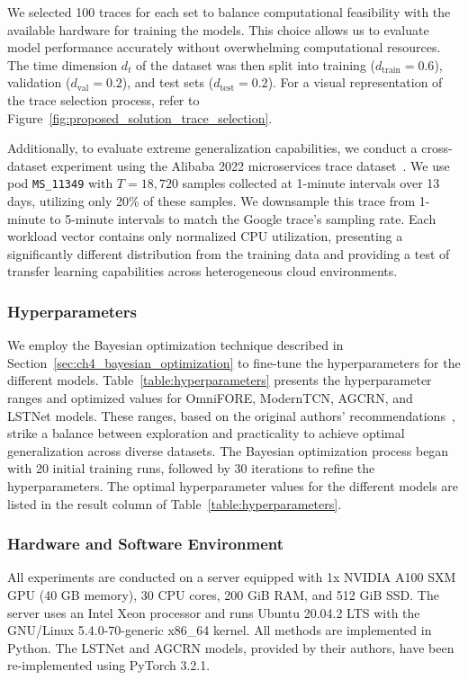 We selected 100 traces for each set to balance computational feasibility with the available hardware for training the models. This choice allows us to evaluate model performance accurately without overwhelming computational resources. The time dimension $d_t$ of the dataset was then split into training ($d_\text{train} = 0.6$), validation ($d_\text{val} = 0.2$), and test sets ($d_\text{test} = 0.2$). For a visual representation of the trace selection process, refer to Figure~\ref{fig:proposed_solution_trace_selection}.

Additionally, to evaluate extreme generalization capabilities, we conduct a cross-dataset experiment using the Alibaba 2022 microservices trace dataset~\cite{8258257}. We use pod \texttt{MS\_11349} with $T = 18,\!720$ samples collected at 1-minute intervals over 13 days, utilizing only 20\% of these samples. We downsample this trace from 1-minute to 5-minute intervals to match the Google trace's sampling rate. Each workload vector contains only normalized \ac{CPU} utilization, presenting a significantly different distribution from the training data and providing a test of transfer learning capabilities across heterogeneous cloud environments.

\subsubsection{\textbf{Hyperparameters}}
We employ the Bayesian optimization technique described in Section~\ref{sec:ch4_bayesian_optimization} to fine-tune the hyperparameters for the different models. Table~\ref{table:hyperparameters} presents the hyperparameter ranges and optimized values for \ac{OmniFORE}, \ac{ModernTCN}, AGCRN, and \ac{LSTNet} models. These ranges, based on the original authors' recommendations~\cite{AGCRN, lai2018modelinglongshorttermtemporal, ModernTCN}, strike a balance between exploration and practicality to achieve optimal generalization across diverse datasets. The Bayesian optimization process began with 20 initial training runs, followed by 30 iterations to refine the hyperparameters. The optimal hyperparameter values for the different models are listed in the result column of Table~\ref{table:hyperparameters}.

\subsubsection{\textbf{Hardware and Software Environment}}
All experiments are conducted on a server equipped with 1x NVIDIA A100 SXM \ac{GPU} (40 \ac{GB} memory), 30 \ac{CPU} cores, 200 \ac{GiB} \ac{RAM}, and 512 \ac{GiB} \ac{SSD}. The server uses an Intel Xeon processor and runs Ubuntu 20.04.2 LTS with the GNU/Linux 5.4.0-70-generic x86\_64 kernel. All methods are implemented in Python. The \ac{LSTNet} and \ac{AGCRN} models, provided by their authors, have been re-implemented using \ac{PyTorch} 3.2.1.



